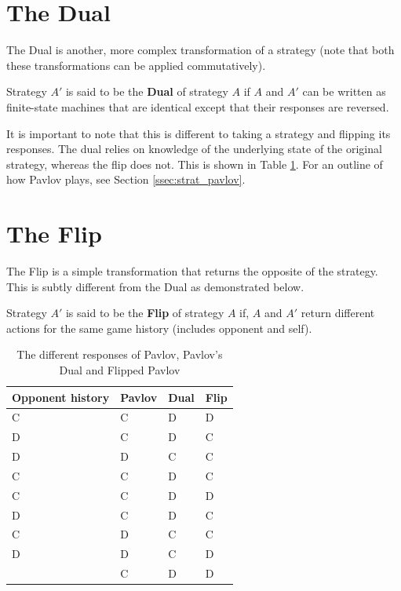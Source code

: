 \section{The Dual}\label{sec:dual}
The Dual is another, more complex transformation of a strategy (note that both
these transformations can be applied commutatively).

\begin{definition}\label{def:dual}
Strategy $A'$ is said to be the \textbf{Dual} of strategy $A$ if $A$ and $A'$ can be written as finite-state machines that are identical except that their responses are reversed.
\end{definition}

It is important to note that this is different to taking a strategy and flipping its responses.
The dual relies on knowledge of the underlying state of the original strategy, whereas the flip does not.
This is shown in Table \ref{tab:strat-dual-flip}.
For an outline of how Pavlov plays, see Section \ref{ssec:strat_pavlov}.

\section{The Flip}\label{sec:flip}
The Flip is a simple transformation that returns the opposite of the strategy.
This is subtly different from the Dual as demonstrated below.

\begin{definition}\label{def:flip}
Strategy $A'$ is said to be the \textbf{Flip} of strategy $A$ if, $A$ and $A'$ return different actions for the same game history (includes opponent and self).
\end{definition}

\begin{table}[htbp]
    \centering
    \begin{tabular}{l l l l}
        \toprule
        Opponent history & Pavlov & Dual & Flip \\
        \midrule
        C & C & D & D \\
        D & C & D & C \\
        D & D & C & C \\
        C & C & D & C \\
        C & C & D & D \\
        D & C & D & C \\
        C & D & C & C \\
        D & D & C & D \\
          & C & D & D \\
        \bottomrule
    \end{tabular}
    \caption{The different responses of Pavlov, Pavlov's Dual and Flipped Pavlov}
    \label{tab:strat-dual-flip}
\end{table}

